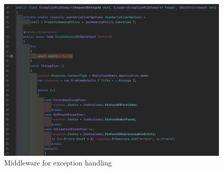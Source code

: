 \begin{figure}
    \centering
    \includegraphics[width=1\linewidth]{exception-handling_middleware.png}
    \caption{Middleware for exception handling}
    \label{fig:exception-handling_middleware}
\end{figure}